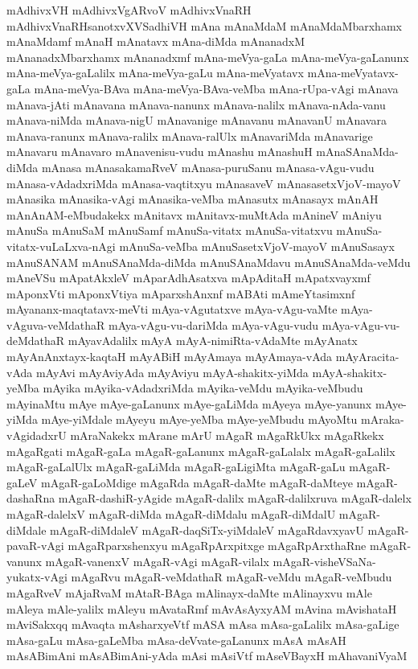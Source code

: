 {mAdhivxVH
mAdhivxVgARvoV
mAdhivxVnaRH
mAdhivxVnaRHsanotxvXVSadhiVH
mAna
mAnaMdaM
mAnaMdaMbarxhamx
mAnaMdamf
mAnaH
mAnatavx
mAna-diMda
mAnanadxM
mAnanadxMbarxhamx
mAnanadxmf
mAna-meVya-gaLa
mAna-meVya-gaLanunx
mAna-meVya-gaLalilx
mAna-meVya-gaLu
mAna-meVyatavx
mAna-meVyatavx-gaLa
mAna-meVya-BAva
mAna-meVya-BAva-veMba
mAna-rUpa-vAgi
mAnava
mAnava-jAti
mAnavana
mAnava-nanunx
mAnava-nalilx
mAnava-nAda-vanu
mAnava-niMda
mAnava-nigU
mAnavanige
mAnavanu
mAnavanU
mAnavara
mAnava-ranunx
mAnava-ralilx
mAnava-ralUlx
mAnavariMda
mAnavarige
mAnavaru
mAnavaro
mAnavenisu-vudu
mAnashu
mAnashuH
mAnaSAnaMda-diMda
mAnasa
mAnasakamaRveV
mAnasa-puruSanu
mAnasa-vAgu-vudu
mAnasa-vAdadxriMda
mAnasa-vaqtitxyu
mAnasaveV
mAnasasetxVjoV-mayoV
mAnasika
mAnasika-vAgi
mAnasika-veMba
mAnasutx
mAnasayx
mAnAH
mAnAnAM-eMbudakekx
mAnitavx
mAnitavx-muMtAda
mAnineV
mAniyu
mAnuSa
mAnuSaM
mAnuSamf
mAnuSa-vitatx
mAnuSa-vitatxvu
mAnuSa-vitatx-vuLaLxva-nAgi
mAnuSa-veMba
mAnuSasetxVjoV-mayoV
mAnuSasayx
mAnuSANAM
mAnuSAnaMda-diMda
mAnuSAnaMdavu
mAnuSAnaMda-veMdu
mAneVSu
mApatAkxleV
mAparAdhAsatxva
mApAditaH
mApatxvayxmf
mAponxVti
mAponxVtiya
mAparxshAnxnf
mABAti
mAmeYtasimxnf
mAyananx-maqtatavx-meVti
mAya-vAgutatxve
mAya-vAgu-vaMte
mAya-vAguva-veMdathaR
mAya-vAgu-vu-dariMda
mAya-vAgu-vudu
mAya-vAgu-vu-deMdathaR
mAyavAdalilx
mAyA
mAyA-nimiRta-vAdaMte
mAyAnatx
mAyAnAnxtayx-kaqtaH
mAyABiH
mAyAmaya
mAyAmaya-vAda
mAyAracita-vAda
mAyAvi
mAyAviyAda
mAyAviyu
mAyA-shakitx-yiMda
mAyA-shakitx-yeMba
mAyika
mAyika-vAdadxriMda
mAyika-veMdu
mAyika-veMbudu
mAyinaMtu
mAye
mAye-gaLanunx
mAye-gaLiMda
mAyeya
mAye-yanunx
mAye-yiMda
mAye-yiMdale
mAyeyu
mAye-yeMba
mAye-yeMbudu
mAyoMtu
mAraka-vAgidadxrU
mAraNakekx
mArane
mArU
mAgaR
mAgaRkUkx
mAgaRkekx
mAgaRgati
mAgaR-gaLa
mAgaR-gaLanunx
mAgaR-gaLalalx
mAgaR-gaLalilx
mAgaR-gaLalUlx
mAgaR-gaLiMda
mAgaR-gaLigiMta
mAgaR-gaLu
mAgaR-gaLeV
mAgaR-gaLoMdige
mAgaRda
mAgaR-daMte
mAgaR-daMteye
mAgaR-dashaRna
mAgaR-dashiR-yAgide
mAgaR-dalilx
mAgaR-dalilxruva
mAgaR-dalelx
mAgaR-dalelxV
mAgaR-diMda
mAgaR-diMdalu
mAgaR-diMdalU
mAgaR-diMdale
mAgaR-diMdaleV
mAgaR-daqSiTx-yiMdaleV
mAgaRdavxyavU
mAgaR-pavaR-vAgi
mAgaRparxshenxyu
mAgaRpArxpitxge
mAgaRpArxthaRne
mAgaR-vanunx
mAgaR-vanenxV
mAgaR-vAgi
mAgaR-vilalx
mAgaR-visheVSaNa-yukatx-vAgi
mAgaRvu
mAgaR-veMdathaR
mAgaR-veMdu
mAgaR-veMbudu
mAgaRveV
mAjaRvaM
mAtaR-BAga
mAlinayx-daMte
mAlinayxvu
mAle
mAleya
mAle-yalilx
mAleyu
mAvataRmf
mAvAsAyxyAM
mAvina
mAvishataH
mAviSakxqq
mAvaqta
mAsharxyeVtf
mASA
mAsa
mAsa-gaLalilx
mAsa-gaLige
mAsa-gaLu
mAsa-gaLeMba
mAsa-deVvate-gaLanunx
mAsA
mAsAH
mAsABimAni
mAsABimAni-yAda
mAsi
mAsiVtf
mAseVBayxH
mAhavaniVyaM
}
